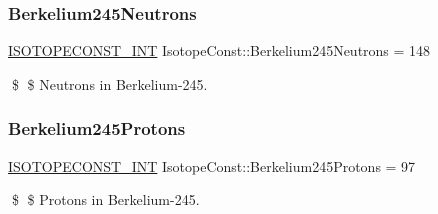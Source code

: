 \subsubsection{\texorpdfstring{Berkelium245\+Neutrons}{Berkelium245Neutrons}}
{\footnotesize\ttfamily \mbox{\hyperlink{group___isotope_const-_macros_ga5f18360b3e99483a35c32d789e62621c}{I\+S\+O\+T\+O\+P\+E\+C\+O\+N\+S\+T\+\_\+\+I\+NT}} Isotope\+Const\+::\+Berkelium245\+Neutrons = 148}

\$ \$ Neutrons in Berkelium-\/245. \mbox{\label{group___isotope_const-_berkelium-_bk245_ga34a6680e1dbb6a8b3eb3c0ab9b7870aa}} 
\subsubsection{\texorpdfstring{Berkelium245\+Protons}{Berkelium245Protons}}
{\footnotesize\ttfamily \mbox{\hyperlink{group___isotope_const-_macros_ga5f18360b3e99483a35c32d789e62621c}{I\+S\+O\+T\+O\+P\+E\+C\+O\+N\+S\+T\+\_\+\+I\+NT}} Isotope\+Const\+::\+Berkelium245\+Protons = 97}

\$ \$ Protons in Berkelium-\/245. 